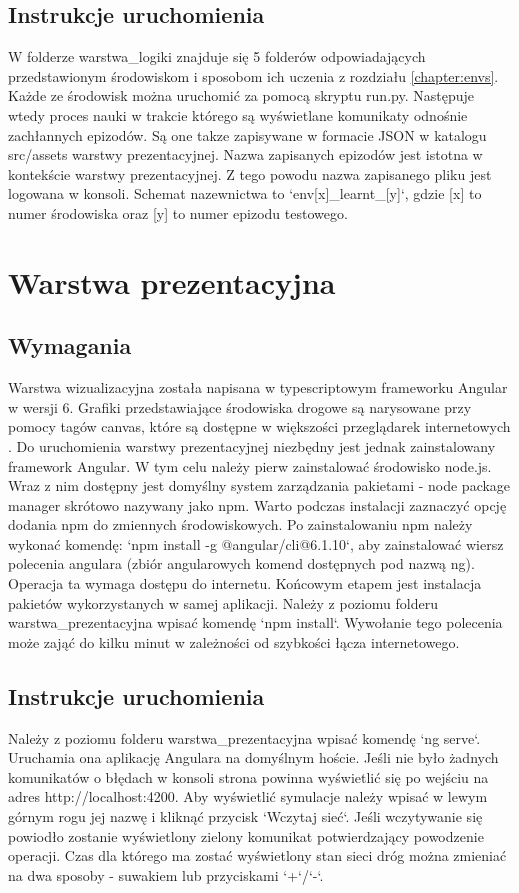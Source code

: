 \documentclass[12pt]{book}
\theoremstyle{plain}
\begin{document}
\subsection{Instrukcje uruchomienia}
W folderze warstwa\_logiki znajduje się 5 folderów odpowiadających przedstawionym środowiskom i sposobom ich uczenia z rozdziału \ref{chapter:envs}. Każde ze środowisk można uruchomić za pomocą skryptu run.py. Następuje wtedy proces nauki w trakcie którego są wyświetlane komunikaty odnośnie zachłannych epizodów. Są one takze zapisywane w formacie JSON w katalogu src/assets warstwy prezentacyjnej. Nazwa zapisanych epizodów jest istotna w kontekście warstwy prezentacyjnej. Z tego powodu nazwa zapisanego pliku jest logowana w konsoli. Schemat nazewnictwa to `env[x]\_learnt\_[y]`, gdzie [x] to numer środowiska oraz [y] to numer epizodu testowego.

\section{Warstwa prezentacyjna}
\subsection{Wymagania}
Warstwa wizualizacyjna została napisana w typescriptowym frameworku Angular w wersji 6. Grafiki przedstawiające środowiska drogowe są narysowane przy pomocy tagów canvas, które są dostępne w większości przeglądarek internetowych \cite{canvas}. Do uruchomienia warstwy prezentacyjnej niezbędny jest jednak zainstalowany framework Angular. W tym celu należy pierw zainstalować środowisko node.js. Wraz z nim dostępny jest domyślny system zarządzania pakietami - node package manager skrótowo nazywany jako npm. Warto podczas instalacji zaznaczyć opcję dodania npm do zmiennych środowiskowych. Po zainstalowaniu npm należy wykonać komendę: `npm install -g @angular/cli@6.1.10`, aby zainstalować wiersz polecenia angulara (zbiór angularowych komend dostępnych pod nazwą ng). Operacja ta wymaga dostępu do internetu. Końcowym etapem jest instalacja pakietów wykorzystanych w samej aplikacji. Należy z poziomu folderu warstwa\_prezentacyjna wpisać komendę `npm install`. Wywołanie tego polecenia może zająć do kilku minut w zależności od szybkości łącza internetowego. 
\subsection{Instrukcje uruchomienia}
Należy z poziomu folderu warstwa\_prezentacyjna wpisać komendę `ng serve`. Uruchamia ona aplikację Angulara na domyślnym hoście. Jeśli nie było żadnych komunikatów o błędach w konsoli strona powinna wyświetlić się po wejściu na adres http://localhost:4200. Aby wyświetlić symulacje należy wpisać w lewym górnym rogu jej nazwę i kliknąć przycisk `Wczytaj sieć`. Jeśli wczytywanie się powiodło zostanie wyświetlony zielony komunikat potwierdzający powodzenie operacji. Czas dla którego ma zostać wyświetlony stan sieci dróg można zmieniać na dwa sposoby - suwakiem lub przyciskami `+`/`-`.




\end{document}
